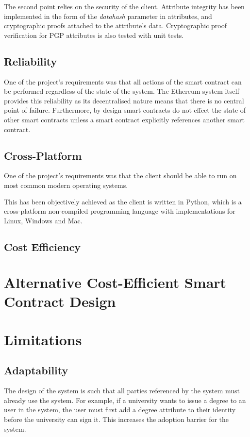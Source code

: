 \documentclass[12pt]{report}
\begin{document}
	The second point relies on the security of the client. Attribute integrity has been implemented in the form of the \textit{datahash} parameter in attributes, and cryptographic proofs attached to the attribute's data. Cryptographic proof verification for PGP attributes is also tested with unit tests.
	
	\subsection{Reliability}
	One of the project's requirements was that all actions of the smart contract can be performed regardless of the state of the system. The Ethereum system itself provides this reliability as its decentralised nature means that there is no central point of failure. Furthermore, by design smart contracts do not effect the state of other smart contracts unless a smart contract explicitly references another smart contract.
	
	\subsection{Cross-Platform}
	One of the project's requirements was that the client should be able to run on most common modern operating systems.
	
	This has been objectively achieved as the client is written in Python, which is a cross-platform non-compiled programming language with implementations for Linux, Windows and Mac.\cite{25}
	
	\subsection{Cost Efficiency}
	
	\section{Alternative Cost-Efficient Smart Contract Design}
	\section{Limitations}
	\subsection{Adaptability}
	The design of the system is such that all parties referenced by the system must already use the system. For example, if a university wants to issue a degree to an user in the system, the user must first add a degree attribute to their identity before the university can sign it. This increases the adoption barrier for the system.
	
\end{document}
